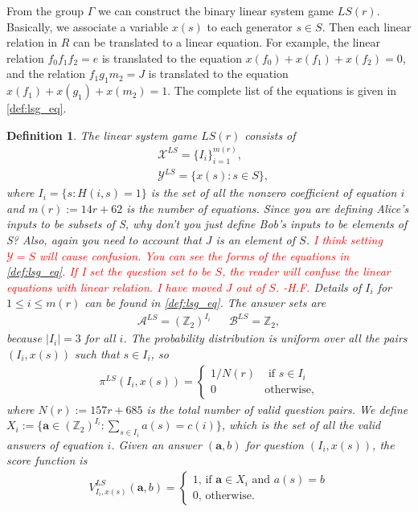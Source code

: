 \documentclass[11pt,letterpaper]{article}
\newcommand{\Z}{\mathbb{Z}}
\newcommand{\calX}{\mathcal{X}}
\newcommand{\calY}{\mathcal{Y}}
\newcommand{\calA}{\mathcal{A}}
\newcommand{\calB}{\mathcal{B}}
\newcommand{\1}{\mathbb{1}}
\newcommand{\LS}{LS}
\newcommand{\mr}{m(r)}
\newcommand{\ba}{\pmb{a}}
\def\carl#1{{\color{blue} #1}}
\newcommand{\hfc}[1]{\textcolor{red}{#1 -H.F.}}
\newtheorem{definition}[theorem]{Definition}
\theoremstyle{definition}
\begin{document}
From the group $\Gamma$ we can construct the binary linear system game $\LS(r)$. Basically,
we associate a variable $x(s)$ to each generator $s \in S$.
Then each linear relation in $R$ can be translated to a linear equation.
For example, the linear relation $f_0f_1f_2 = e$ is translated to the equation $x(f_0) + x(f_1) + x(f_2) = 0$, and the relation 
$f_1g_1m_2 = J$ is translated to the equation
$x(f_1) + x(g_1) + x(m_2) = 1$. 
The complete list of the equations is given in \cref{def:lsg_eq}.
\begin{definition}
\label{def:lsg}
The linear system game $\LS(r)$ consists of
\begin{align*}
    & \calX^{\LS} = \{I_i\}_{i=1}^{\mr}, \\
    & \calY^{\LS} = \{ x(s) : s \in S \},
\end{align*}
where $I_i = \{ s : H(i,s) = 1\}$ is the set of all the nonzero coefficient of equation $i$
and $\mr := 14r + 62$ is the number of equations.  
\carl{Since you are defining Alice's inputs to be subsets of S, why don't you just define Bob's inputs to be elements of S? Also, again you need to account that
$J$ is an element of $S$.}
\hfc{I think setting $\calY = S$ will cause confusion.
You can see the forms of the equations in \cref{def:lsg_eq}.
If I set the question set to be $S$, the reader will confuse the 
linear equations with linear relation.
I have moved $J$ out of $S$.}
Details of $I_i$ for $1 \leq i \leq \mr$ can be found in \cref{def:lsg_eq}.
The answer sets are 
\begin{align*}
    \calA^{\LS} = (\Z_2)^{I_i} && \calB^{\LS} = \Z_2,
\end{align*}
because $|I_i| = 3$ for all $i$.
The probability distribution is uniform over all the pairs $(I_i, x(s))$ such that $s \in I_i$, so
\begin{align*}
    \pi^{\LS}(I_i, x(s)) = 
    \begin{cases}
        1/N(r) & \text{ if } s \in I_i \\
        0 & \text{otherwise,}
    \end{cases}
\end{align*}
where $N(r) := 157r + 685$ is the total number of valid question pairs.
We define $X_i := \{ \ba \in (\Z_2)^{I_i}: \sum_{s \in I_i} a(s) = c(i) \}$, which is the set of all the valid answers of equation $i$.
Given an answer $(\ba,b)$ for question $(I_i,x(s))$, 
the score function is
\begin{align*}
    V^{\LS}_{I_i, x(s)}(\ba, b) = 
    \begin{cases}
        1 \text{, if } \ba \in X_i \text{ and } a(s) = b\\
        0 \text{, otherwise}.
    \end{cases}
\end{align*}
\end{definition}
\end{document}
